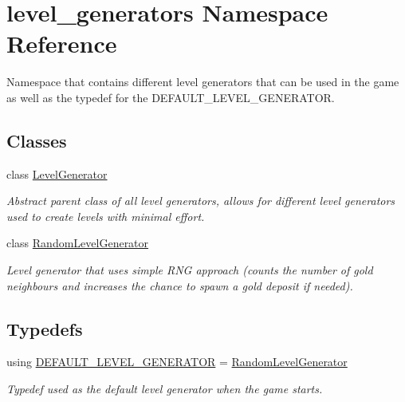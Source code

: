 \hypertarget{namespacelevel__generators}{}\section{level\+\_\+generators Namespace Reference}
\label{namespacelevel__generators}


Namespace that contains different level generators that can be used in the game as well as the typedef for the D\+E\+F\+A\+U\+L\+T\+\_\+\+L\+E\+V\+E\+L\+\_\+\+G\+E\+N\+E\+R\+A\+T\+OR.  


\subsection*{Classes}
\begin{DoxyCompactItemize}
\item 
class \hyperlink{classlevel__generators_1_1_level_generator}{Level\+Generator}
\begin{DoxyCompactList}\small\item\em Abstract parent class of all level generators, allows for different level generators used to create levels with minimal effort. \end{DoxyCompactList}\item 
class \hyperlink{classlevel__generators_1_1_random_level_generator}{Random\+Level\+Generator}
\begin{DoxyCompactList}\small\item\em Level generator that uses simple R\+NG approach (counts the number of gold neighbours and increases the chance to spawn a gold deposit if needed). \end{DoxyCompactList}\end{DoxyCompactItemize}
\subsection*{Typedefs}
\begin{DoxyCompactItemize}
\item 
using \hyperlink{namespacelevel__generators_a22093c5a79dfcbc43107c23b5eee6375}{D\+E\+F\+A\+U\+L\+T\+\_\+\+L\+E\+V\+E\+L\+\_\+\+G\+E\+N\+E\+R\+A\+T\+OR} = \hyperlink{classlevel__generators_1_1_random_level_generator}{Random\+Level\+Generator}
\begin{DoxyCompactList}\small\item\em Typedef used as the default level generator when the game starts. \end{DoxyCompactList}\end{DoxyCompactItemize}


